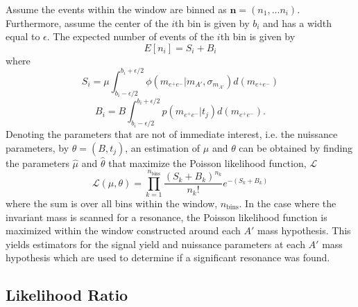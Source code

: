 Assume the events within the window are binned as $\mathbf{n} = (n_{1}, ... n_{i})$.
Furthermore, assume the center of the $i$th bin is given by $b_i$ and has a width
equal to $\epsilon$. 
The expected number of events of the $i$th bin is given by 
\begin{equation}
    E[n_i] = S_{i} + B_{i}
\end{equation}
where 
\begin{equation}
    S_{i} = \mu \int_{b_i - \epsilon/2}^{b_i + \epsilon/2} \phi(m_{e^+e^-} | m_{A'}, \sigma_{m_{A'}}) d (m_{e^+e^-})
\end{equation} 
\begin{equation}
    B_{i} = B \int_{b_i - \epsilon/2}^{b_i + \epsilon/2} p(m_{e^+e^-} | t_{j}) d (m_{e^+e^-}).
\end{equation}
Denoting the parameters that are not of immediate interest, i.e. the nuissance
parameters, by $\theta = (B,  t_{j})$, an estimation
of $\mu$ and $\theta$ can be obtained by finding the parameters $\hat{\mu}$ and
$\hat{\theta}$ that maximize the Poisson likelihood function, $\mathcal{L}$
\begin{equation}
\mathcal{L}(\mu, \theta) = \prod_{k=1}^{n_{\text{bins}}} \frac{(S_{k} + B_{k})^{n_k}}{n_{k}!} e^{-(S_{k} + B_{k})}
\end{equation}
where the sum is over all bins within the window, $n_{\text{bins}}$.
In the case where the invariant mass is scanned for a resonance, the Poisson 
likelihood function is maximized within the window constructed around each
$A'$ mass hypothesis. This yields estimators for the signal yield and nuissance
parameters at each $A'$ mass hypothesis which are used to determine if a significant 
resonance was found.

\subsection{Likelihood Ratio} \label{sub:likelihood_ratio}

